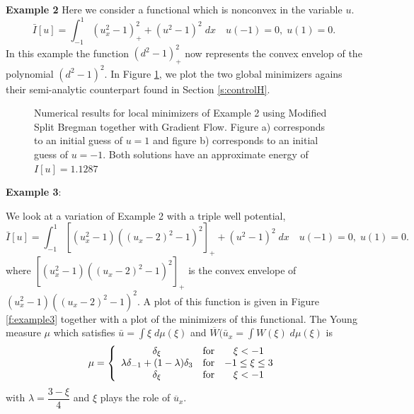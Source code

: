 \documentclass[11pt]{article}
\theoremstyle{plain}
\begin{document}
{\bf Example 2}
Here we consider a functional which is nonconvex in the variable $u$. 
\[ \bar{I}[u] = \int_{-1}^1 (u_x^2-1)_+^2 + (u^2-1)^2 \;dx \quad u(-1) = 0,\; u(1) = 0.\]
In this example the function $(d^2-1)^2_+$ now represents the convex envelop of the polynomial $(d^2-1)^2$. In Figure \ref{f:example2}, we plot the two global minimizers agains their semi-analytic counterpart found in Section \ref{s:controlH}.


\begin{figure}[h]
\centering
{}
 \caption{Numerical results for local minimizers of Example 2 using Modified Split Bregman together with Gradient Flow. Figure a) corresponds to an initial guess of $u =1$ and figure b) corresponds to an initial guess of $u =-1$. Both solutions have an approximate energy of $I[u] = 1.1287$ }\label{f:example2}
\end{figure}


{\bf Example 3}:

We look at a variation of Example 2 with a triple well potential,
\[ \bar{I}[u] = \int_{-1}^1 [(u_x^2-1)( (u_x-2)^2 -1)^2]_+ + (u^2-1)^2 \;dx \quad u(-1) = 0,\; u(1) = 0.\]
where $[(u_x^2-1)( (u_x-2)^2 -1)^2]_+$ is the convex envelope of $(u_x^2-1)( (u_x-2)^2 -1)^2$. A plot of this function is given in Figure \ref{f:example3} together with a plot of the  minimizers of this functional. The Young measure $\mu$ which satisfies $\bar{u} = \int \xi \;d\mu(\xi)$ and $\overline{W}(\bar{u}_x = \int W(\xi) \;d\mu(\xi)$ is 
\[ \mu = \left\{ \begin{array}{c c c}
\delta_\xi & \mbox{for} & \xi < -1\\
\lambda \delta_{-1} + (1- \lambda) \delta_3 & \mbox{for} &-1\leq  \xi \leq 3\\
\delta_\xi & \mbox{for} & \xi < -1
\end{array} \right.
\]
with $\lambda = \dfrac{3 -\xi}{4}$ and $\xi$ plays the role of $\overline{u}_x$.
\end{document}
